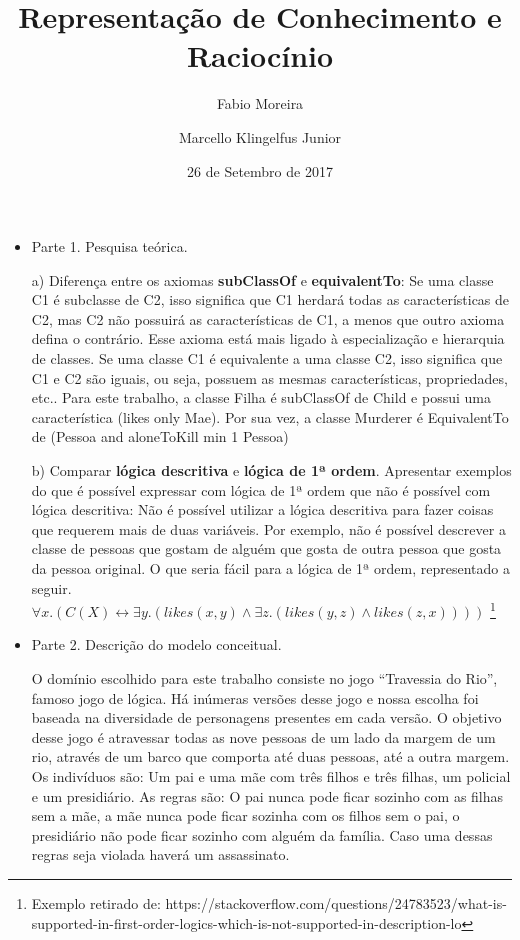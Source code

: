\documentclass[a4paper,12pt]{article}
\title{Representação de Conhecimento e Raciocínio}
\author{Fabio Moreira \and Marcello Klingelfus Junior}
\date{26 de Setembro de 2017}
\begin{document}
\maketitle

\begin{itemize}
\item Parte 1. Pesquisa teórica.

a) Diferença entre os axiomas \textbf{subClassOf} e \textbf{equivalentTo}: Se uma classe C1 é subclasse de C2, isso significa que C1 
herdará todas as características de C2, mas C2 não possuirá as características de C1, a menos que outro axioma defina o contrário. Esse axioma está
mais ligado à especialização e hierarquia de classes. Se uma classe C1 é equivalente a uma classe C2, isso significa que C1 e C2 são iguais, ou seja,
possuem as mesmas características, propriedades, etc.. Para este trabalho, a classe Filha é subClassOf de Child e possui uma característica (likes only Mae).
Por sua vez, a classe Murderer é EquivalentTo de (Pessoa and aloneToKill min 1 Pessoa)

b) Comparar \textbf{lógica descritiva} e \textbf{lógica de 1ª ordem}. Apresentar exemplos do que é possível
expressar com lógica de 1ª ordem que não é possível com lógica descritiva: Não é possível utilizar a lógica descritiva para fazer coisas que requerem
mais de duas variáveis. Por exemplo, não é possível descrever a classe de pessoas que gostam de alguém que gosta de outra pessoa que gosta da pessoa original.
O que seria fácil para a lógica de 1ª ordem, representado a seguir. $ \forall x.(C(X) \leftrightarrow  \exists y.(likes(x,y) \wedge \exists z.(likes(y,z) \wedge likes(z,x))))$ \footnote{Exemplo retirado de: https://stackoverflow.com/questions/24783523/what-is-supported-in-first-order-logics-which-is-not-supported-in-description-lo}

\end{itemize}

\begin{itemize}
 \item Parte 2. Descrição do modelo conceitual.
 
 O domínio escolhido para este trabalho consiste no jogo ``Travessia do Rio'', famoso jogo de lógica.
 Há inúmeras versões desse jogo e nossa escolha foi baseada na diversidade de personagens
 presentes em cada versão. O objetivo desse jogo é atravessar todas as nove pessoas de um lado da margem de um rio, 
 através de um barco que comporta até duas pessoas, até a outra margem. Os indivíduos são:
 Um pai e uma mãe com três filhos e três filhas, um policial e um presidiário. As regras são:
 O pai nunca pode ficar sozinho com as filhas sem a mãe, a mãe nunca pode ficar sozinha
 com os filhos sem o pai, o presidiário não pode ficar sozinho com alguém da família.
 Caso uma dessas regras seja violada haverá um assassinato.
 
\end{itemize}
\end{document}
